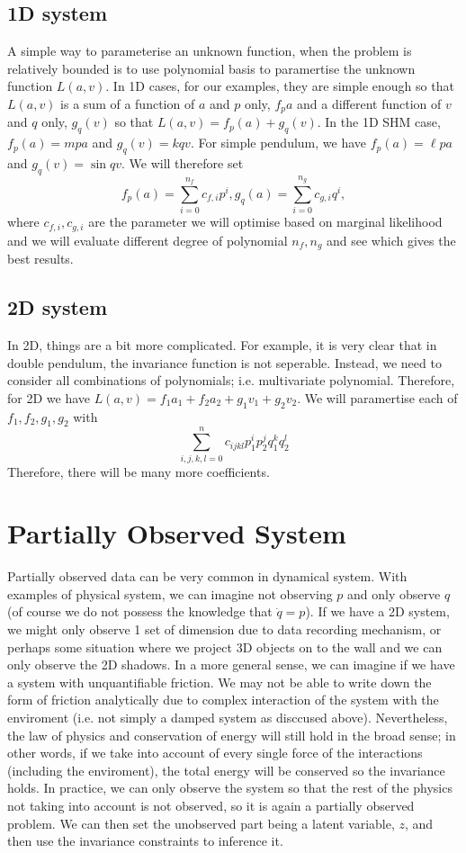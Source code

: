 \documentclass{statsmsc}
\begin{document}
\subsection{1D system}
A simple way to parameterise an unknown function, when the problem is relatively bounded is to use polynomial basis to paramertise the unknown function $L(a,v)$.
In 1D cases, for our examples, they are simple enough so that $L(a,v)$ is a sum of a function of $a$ and $p$ only, $f_pa$ and a different function of $v$ and $q$ only, $g_q(v)$ so that $L(a,v)=f_p(a)+g_q(v)$.
In the 1D SHM case, $f_p(a)=mpa$ and $g_q(v)=kqv$.
For simple pendulum, we have $f_p(a)=\ell pa$ and $g_q(v)=\sin qv$.
We will therefore set $$f_p(a)=\sum_{i=0}^{n_f}c_{f,i}p^i,g_q(a)=\sum_{i=0}^{n_g}c_{g,i}q^i,$$
where $c_{f,i}, c_{g,i}$ are the parameter we will optimise based on marginal likelihood and we will evaluate different degree of polynomial $n_f, n_g$ and see which gives the best results. 

\subsection{2D system}
In 2D, things are a bit more complicated. For example, it is very clear that in double pendulum, the invariance function is not seperable.
Instead, we need to consider all combinations of polynomials; i.e. multivariate polynomial.
Therefore, for 2D we have $L(a,v)=f_1a_1+f_2a_2+g_1v_1+g_2v_2.$
We will paramertise each of $f_1, f_2, g_1, g_2$ with $$\sum_{i,j,k,l=0}^{n}c_{ijkl}p_1^ip_2^jq_1^kq_2^l$$
Therefore, there will be many more coefficients.

\section{Partially Observed System}
Partially observed data can be very common in dynamical system.
With examples of physical system, we can imagine not observing $p$ and only observe $q$ (of course we do not possess the knowledge that $\dot{q}=p$).
If we have a 2D system, we might only observe 1 set of dimension due to data recording mechanism, or perhaps some situation where we project 3D objects on to the wall and we can only observe the 2D shadows.
In a more general sense, we can imagine if we have a system with unquantifiable friction.
We may not be able to write down the form of friction analytically due to complex interaction of the system with the enviroment (i.e. not simply a damped system as disccused above).
Nevertheless, the law of physics and conservation of energy will still hold in the broad sense; 
in other words, if we take into account of every single force of the interactions (including the enviroment), the total energy will be conserved so the invariance holds. 
In practice, we can only observe the system so that the rest of the physics not taking into account is not observed, so it is again a partially observed problem.
We can then set the unobserved part being a latent variable, $z$,  and then use the invariance constraints to inference it.
\end{document}
